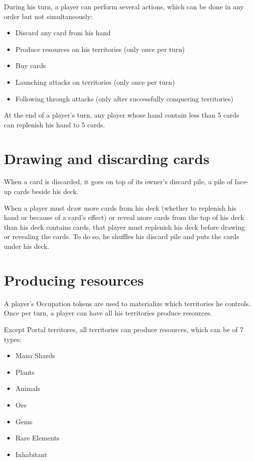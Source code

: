 \documentclass[a4paper]{article}
\begin{document}
    During his turn, a player can perform several actions, which can be done in any order but not simultaneously:

    \begin{itemize}
        \item Discard any card from his hand
        \item Produce resources on his territories (only once per turn)
        \item Buy cards
        \item Launching attacks on territories (only once per turn)
        \item Following through attacks (only after successfully conquering territories)
    \end{itemize}

    At the end of a player's turn, any player whose hand contain less than 5 cards can replenish his hand to 5 cards.



\section{Drawing and discarding cards}

    When a card is discarded, it goes on top of its owner's discard pile, a pile of face-up cards beside his deck.

    When a player must draw more cards from his deck (whether to replenish his hand or because of a card's effect)
    or reveal more cards from the top of his deck than his deck contains cards, that player must replenish his deck before
    drawing or revealing the cards.
    To do so, he shuffles his discard pile and puts the cards under his deck.



\section{Producing resources}

    A player's Occupation tokens are used to materialize which territories he controls.
    Once per turn, a player can have all his territories produce resources.

    Except Portal territores, all territories can produce resources, which can be of 7 types:

    \begin{itemize}
        \item Mana Shards
        \item Plants
        \item Animals
        \item Ore
        \item Gems
        \item Rare Elements
        \item Inhabitant
    \end{itemize}
\end{document}

